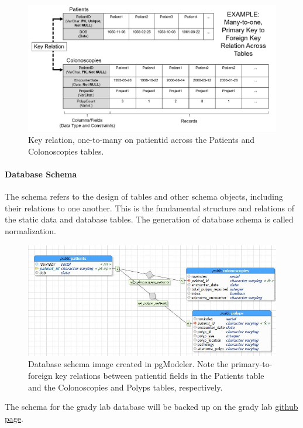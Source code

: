 \documentclass[]{article}
\let\oldparagraph\paragraph
\renewcommand{\paragraph}[1]{\oldparagraph{#1}\mbox{}}
\begin{document}
\begin{figure}[htbp]
\centering
\includegraphics{keyrelation_clip.JPG}
\caption{Key relation, one-to-many on patientid across the Patients and
Colonoscopies tables.}
\end{figure}

\paragraph{Database Schema}\label{database-schema}

The schema refers to the design of tables and other schema objects,
including their relations to one another. This is the fundamental
structure and relations of the static data and database tables. The
generation of database schema is called normalization.

\begin{figure}[htbp]
\centering
\includegraphics{patient_coln_polyps_tablerelations.jpg}
\caption{Database schema image created in pgModeler. Note the
primary-to-foreign key relations between patientid fields in the
Patients table and the Colonoscopies and Polyps tables, respectively.}
\end{figure}

The schema for the grady lab database will be backed up on the grady lab
\href{https://github.com/GradyLab/GradyLab_PostgreSQL}{github page}.
\end{document}
